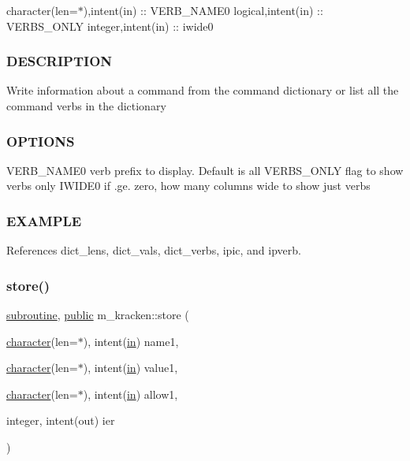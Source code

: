 character(len=$\ast$),intent(in) \+:\+: V\+E\+R\+B\+\_\+\+N\+A\+M\+E0 logical,intent(in) \+:\+: V\+E\+R\+B\+S\+\_\+\+O\+N\+LY integer,intent(in) \+:\+: iwide0 \subsubsection*{D\+E\+S\+C\+R\+I\+P\+T\+I\+ON}

Write information about a command from the command dictionary or list all the command verbs in the dictionary

\subsubsection*{O\+P\+T\+I\+O\+NS}

V\+E\+R\+B\+\_\+\+N\+A\+M\+E0 verb prefix to display. Default is all V\+E\+R\+B\+S\+\_\+\+O\+N\+LY flag to show verbs only I\+W\+I\+D\+E0 if .ge. zero, how many columns wide to show just verbs

\subsubsection*{E\+X\+A\+M\+P\+LE}

References dict\+\_\+lens, dict\+\_\+vals, dict\+\_\+verbs, ipic, and ipverb.

\mbox{\label{namespacem__kracken_a6eb597e3ca7d161933f595788d511fd7}} 
\subsubsection{\texorpdfstring{store()}{store()}}
{\footnotesize\ttfamily \hyperlink{M__stopwatch_83_8txt_acfbcff50169d691ff02d4a123ed70482}{subroutine}, \hyperlink{M__stopwatch_83_8txt_a2f74811300c361e53b430611a7d1769f}{public} m\+\_\+kracken\+::store (\begin{DoxyParamCaption}\item[{\hyperlink{option__stopwatch_83_8txt_abd4b21fbbd175834027b5224bfe97e66}{character}(len=$\ast$), intent(\hyperlink{M__journal_83_8txt_afce72651d1eed785a2132bee863b2f38}{in})}]{name1,  }\item[{\hyperlink{option__stopwatch_83_8txt_abd4b21fbbd175834027b5224bfe97e66}{character}(len=$\ast$), intent(\hyperlink{M__journal_83_8txt_afce72651d1eed785a2132bee863b2f38}{in})}]{value1,  }\item[{\hyperlink{option__stopwatch_83_8txt_abd4b21fbbd175834027b5224bfe97e66}{character}(len=$\ast$), intent(\hyperlink{M__journal_83_8txt_afce72651d1eed785a2132bee863b2f38}{in})}]{allow1,  }\item[{integer, intent(out)}]{ier }\end{DoxyParamCaption})}



